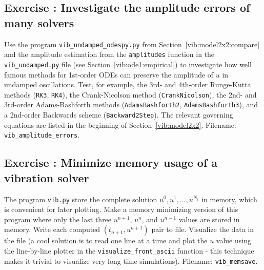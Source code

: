 \documentclass[%
oneside,                 %
final,                   %
10pt]{article}
\newenvironment{doconceexercise}{}{}
\newcounter{doconceexercisecounter}
\begin{document}
\begin{doconceexercise}

\subsection*{Exercise \thedoconceexercisecounter: Investigate the amplitude errors of many solvers}

\label{vib:exer:undamped:odespy}

Use the program \Verb!vib_undamped_odespy.py! from Section~\ref{vib:model2x2:compare} and the amplitude estimation from the
\texttt{amplitudes} function in the \Verb!vib_undamped.py! file (see Section~\ref{vib:ode1:empirical}) to investigate how well famous methods for
1st-order ODEs can preserve the amplitude of $u$ in undamped
oscillations.  Test, for example, the 3rd- and 4th-order Runge-Kutta
methods (\texttt{RK3}, \texttt{RK4}), the Crank-Nicolson method (\texttt{CrankNicolson}),
the 2nd- and 3rd-order Adams-Bashforth methods (\texttt{AdamsBashforth2},
\texttt{AdamsBashforth3}), and a 2nd-order Backwards scheme
(\texttt{Backward2Step}).  The relevant governing equations are listed in
the beginning of Section~\ref{vib:model2x2}.
\noindent Filename: \Verb!vib_amplitude_errors!.

\end{doconceexercise}




\begin{doconceexercise}

\subsection*{Exercise \thedoconceexercisecounter: Minimize memory usage of a vibration solver}

\label{vib:exer:memsave}

The program \href{{http://tinyurl.com/nm5587k/vib/vib.py}}{\nolinkurl{vib.py}}
store the complete solution $u^0,u^1,\ldots,u^{N_t}$ in memory, which is
convenient for later plotting.
Make a memory minimizing version of this program where only the last three
$u^{n+1}$, $u^n$, and $u^{n-1}$ values are stored in memory.
Write each computed $(t_{n+1}, u^{n+1})$ pair to file.
Visualize the data in the file (a cool solution is to
read one line at a time and
plot the $u$ value using the line-by-line plotter in the
\Verb!visualize_front_ascii! function - this technique makes it trivial
to visualize very long time simulations).
\noindent Filename: \Verb!vib_memsave!.

\end{doconceexercise}
\end{document}
